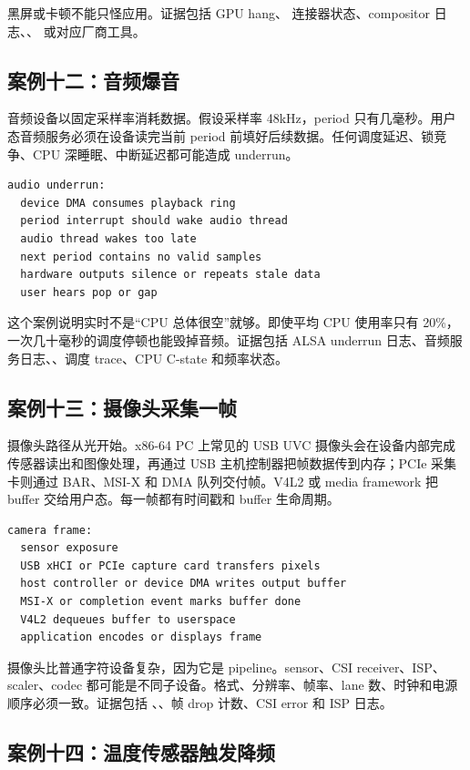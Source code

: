 黑屏或卡顿不能只怪应用。证据包括  GPU hang、 连接器状态、compositor 日志、、 或对应厂商工具。

\subsection{案例十二：音频爆音}

音频设备以固定采样率消耗数据。假设采样率 48kHz，period 只有几毫秒。用户态音频服务必须在设备读完当前 period 前填好后续数据。任何调度延迟、锁竞争、CPU 深睡眠、中断延迟都可能造成 underrun。

\begin{lstlisting}
audio underrun:
  device DMA consumes playback ring
  period interrupt should wake audio thread
  audio thread wakes too late
  next period contains no valid samples
  hardware outputs silence or repeats stale data
  user hears pop or gap
\end{lstlisting}

这个案例说明实时不是“CPU 总体很空”就够。即使平均 CPU 使用率只有 20\%，一次几十毫秒的调度停顿也能毁掉音频。证据包括 ALSA underrun 日志、音频服务日志、、调度 trace、CPU C-state 和频率状态。

\subsection{案例十三：摄像头采集一帧}

摄像头路径从光开始。x86-64 PC 上常见的 USB UVC 摄像头会在设备内部完成传感器读出和图像处理，再通过 USB 主机控制器把帧数据传到内存；PCIe 采集卡则通过 BAR、MSI-X 和 DMA 队列交付帧。V4L2 或 media framework 把 buffer 交给用户态。每一帧都有时间戳和 buffer 生命周期。

\begin{lstlisting}
camera frame:
  sensor exposure
  USB xHCI or PCIe capture card transfers pixels
  host controller or device DMA writes output buffer
  MSI-X or completion event marks buffer done
  V4L2 dequeues buffer to userspace
  application encodes or displays frame
\end{lstlisting}

摄像头比普通字符设备复杂，因为它是 pipeline。sensor、CSI receiver、ISP、scaler、codec 都可能是不同子设备。格式、分辨率、帧率、lane 数、时钟和电源顺序必须一致。证据包括 、、帧 drop 计数、CSI error 和 ISP 日志。

\subsection{案例十四：温度传感器触发降频}

